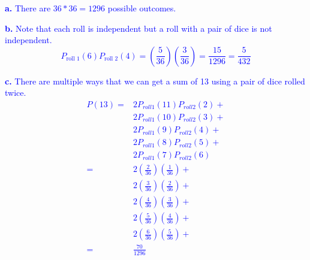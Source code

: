 \documentclass[
]{article}
\begin{document}
\textcolor{blue}{\textbf{a.}
There are $36*36 = 1296$ possible outcomes.}

\textcolor{blue}{\textbf{b.} Note that each roll is independent but a roll with a pair of dice is not independent.
$$P_{\text{roll 1}}(6)P_{\text{roll 2}}(4) = \left(\frac{5}{36}\right)\left(\frac{3}{36}\right) = \frac{15}{1296} = \frac{5}{432}$$}

\textcolor{blue}{\textbf{c.} There are multiple ways that we can get a sum of 13 using a pair of dice rolled twice.
\begin{align*}
  P(13) = & 2P_{roll 1}(11)P_{roll 2}(2) + \\
          & 2P_{roll 1}(10)P_{roll 2}(3) + \\
          & 2P_{roll 1}(9)P_{roll 2}(4) + \\
          & 2P_{roll 1}(8)P_{roll 2}(5) + \\
          & 2P_{roll 1}(7)P_{roll 2}(6) \\
        = & 2 \left(\frac{2}{36}\right)\left(\frac{1}{36}\right) + \\
          & 2 \left(\frac{3}{36}\right)\left(\frac{2}{36}\right) + \\
          & 2 \left(\frac{4}{36}\right)\left(\frac{3}{36}\right) + \\
          & 2 \left(\frac{5}{36}\right)\left(\frac{4}{36}\right) + \\
          & 2 \left(\frac{6}{36}\right)\left(\frac{5}{36}\right) + \\
        = & \frac{70}{1296}
\end{align*}}
\end{document}
